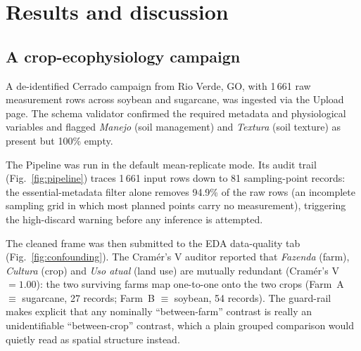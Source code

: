 \documentclass[11pt, letterpaper]{article}
\begin{document}
\section{Results and discussion}\label{sec:examples}

\subsection{A crop-ecophysiology campaign}\label{sec:ex-physio}

A de-identified Cerrado campaign from Rio Verde, GO, with 1\,661 raw measurement rows across soybean and sugarcane, was ingested via the Upload page. The schema validator confirmed the required metadata and physiological variables and flagged \emph{Manejo} (soil management) and \emph{Textura} (soil texture) as present but 100\% empty.

The Pipeline was run in the default mean-replicate mode. Its audit trail (Fig.~\ref{fig:pipeline}) traces 1\,661 input rows down to 81 sampling-point records: the essential-metadata filter alone removes 94.9\% of the raw rows (an incomplete sampling grid in which most planned points carry no measurement), triggering the high-discard warning before any inference is attempted.

The cleaned frame was then submitted to the EDA data-quality tab (Fig.~\ref{fig:confounding}). The Cram\'er's V auditor reported that \emph{Fazenda} (farm), \emph{Cultura} (crop) and \emph{Uso atual} (land use) are mutually redundant (Cram\'er's V $=1.00$): the two surviving farms map one-to-one onto the two crops (Farm~A $\equiv$ sugarcane, 27 records; Farm~B $\equiv$ soybean, 54 records). The guard-rail makes explicit that any nominally ``between-farm'' contrast is really an unidentifiable ``between-crop'' contrast, which a plain grouped comparison would quietly read as spatial structure instead.
\end{document}
